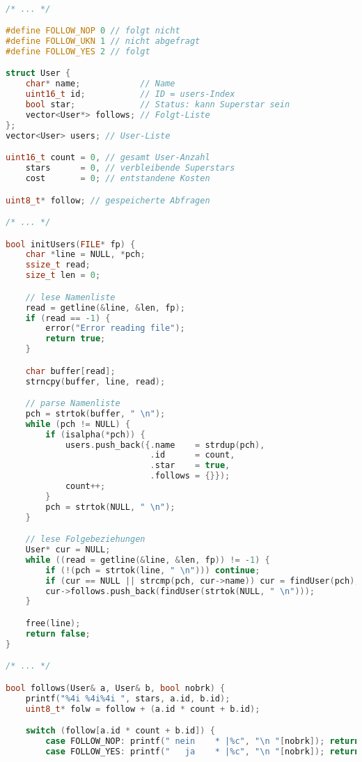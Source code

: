 \documentclass[a4paper,10pt,ngerman]{scrartcl}
\begin{document}
\begin{lstlisting}[language=C++]

/* ... */

#define FOLLOW_NOP 0 // folgt nicht
#define FOLLOW_UKN 1 // nicht abgefragt
#define FOLLOW_YES 2 // folgt

struct User {
    char* name;            // Name
    uint16_t id;           // ID = users-Index
    bool star;             // Status: kann Superstar sein
    vector<User*> follows; // Folgt-Liste
};
vector<User> users; // User-Liste

uint16_t count = 0, // gesamt User-Anzahl
    stars      = 0, // verbleibende Superstars
    cost       = 0; // entstandene Kosten

uint8_t* follow; // gespeicherte Abfragen

/* ... */

bool initUsers(FILE* fp) {
    char *line = NULL, *pch;
    ssize_t read;
    size_t len = 0;

    // lese Namenliste
    read = getline(&line, &len, fp);
    if (read == -1) {
        error("Error reading file");
        return true;
    }

    char buffer[read];
    strncpy(buffer, line, read);

    // parse Namenliste
    pch = strtok(buffer, " \n");
    while (pch != NULL) {
        if (isalpha(*pch)) {
            users.push_back({.name    = strdup(pch),
                             .id      = count,
                             .star    = true,
                             .follows = {}});
            count++;
        }
        pch = strtok(NULL, " \n");
    }

    // lese Folgebeziehungen
    User* cur = NULL;
    while ((read = getline(&line, &len, fp)) != -1) {
        if (!(pch = strtok(line, " \n"))) continue;
        if (cur == NULL || strcmp(pch, cur->name)) cur = findUser(pch);
        cur->follows.push_back(findUser(strtok(NULL, " \n")));
    }

    free(line);
    return false;
}

/* ... */

bool follows(User& a, User& b, bool nobrk) {
    printf("%4i %4i%4i ", stars, a.id, b.id);
    uint8_t* folw = follow + (a.id * count + b.id);

    switch (follow[a.id * count + b.id]) {
        case FOLLOW_NOP: printf(" nein    * |%c", "\n "[nobrk]); return false;
        case FOLLOW_YES: printf("   ja    * |%c", "\n "[nobrk]); return true;


\end{lstlisting}
\end{document}
